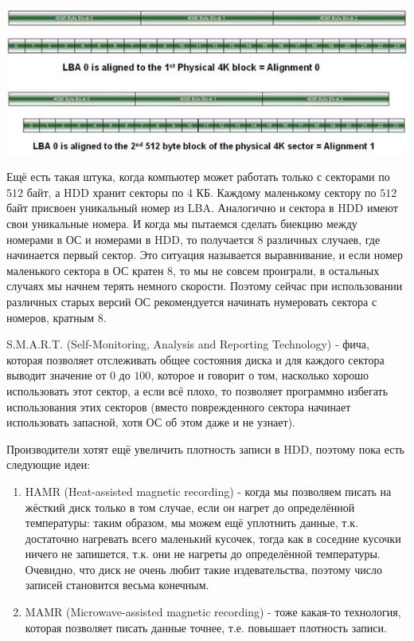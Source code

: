 \documentclass[12pt, a4paper]{article}
\begin{document}
\begin{center}
\includegraphics[scale=0.5]{./images/example.jpg}
\end{center}

Ещё есть такая штука, когда компьютер может работать только с секторами по $512$ байт, а HDD хранит секторы по $4$ КБ. Каждому маленькому сектору по $512$ байт присвоен уникальный номер из LBA. Аналогично и сектора в HDD имеют свои уникальные номера. И когда мы пытаемся сделать биекцию между номерами в ОС и номерами в HDD, то получается $8$ различных случаев, где начинается первый сектор. Это ситуация называется выравнивание, и если номер маленького сектора в ОС кратен $8$, то мы не совсем проиграли, в остальных случаях мы начнем терять немного скорости. Поэтому сейчас при использовании различных старых версий ОС рекомендуется начинать нумеровать сектора с номеров, кратным $8$. 

S.M.A.R.T. (Self-Monitoring, Analysis and Reporting Technology) - фича, которая позволяет отслеживать общее состояния диска и для каждого сектора выводит значение от $0$ до $100$, которое и говорит о том, насколько хорошо использовать этот сектор, а если всё плохо, то позволяет программно избегать использования этих секторов (вместо поврежденного сектора начинает использовать запасной, хотя ОС об этом даже и не узнает).

Производители хотят ещё увеличить плотность записи в HDD, поэтому пока есть следующие идеи:
\begin{enumerate}
	\item HAMR (Heat-assisted magnetic recording) - когда мы позволяем писать на жёсткий диск только в том случае, если он нагрет до определённой температуры: таким образом, мы можем ещё уплотнить данные, т.к. достаточно нагревать всего маленький кусочек, тогда как в соседние кусочки ничего не запишется, т.к. они не нагреты до определённой температуры. Очевидно, что диск не очень любит такие издевательства, поэтому число записей становится весьма конечным.
	\item MAMR (Microwave-assisted magnetic recording) - тоже какая-то технология, которая позволяет писать данные точнее, т.е. повышает плотность записи.
\end{enumerate}
\end{document}
